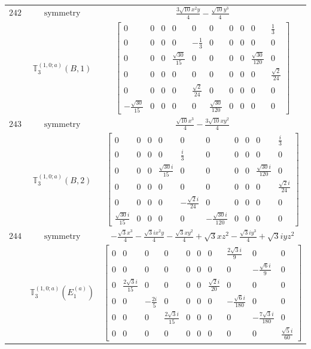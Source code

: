 \documentclass[fleqn,8pt,landscape]{jsarticle}
\begin{document}
\begin{longtable}{ccc}
$ 242 $ & $ \text{symmetry} $ & $ \frac{3 \sqrt{10} x^{2} y}{4} - \frac{\sqrt{10} y^{3}}{4} $ \\
$  $ & $ \mathbb{T}_{3}^{(1,0;a)}(B,1) $ & $ \begin{bmatrix} 0 & 0 & 0 & 0 & 0 & 0 & 0 & 0 & 0 & \frac{1}{3} \\ 0 & 0 & 0 & 0 & - \frac{1}{3} & 0 & 0 & 0 & 0 & 0 \\ 0 & 0 & 0 & \frac{\sqrt{30}}{15} & 0 & 0 & 0 & 0 & \frac{\sqrt{30}}{120} & 0 \\ 0 & 0 & 0 & 0 & 0 & 0 & 0 & 0 & 0 & \frac{\sqrt{2}}{24} \\ 0 & 0 & 0 & 0 & \frac{\sqrt{2}}{24} & 0 & 0 & 0 & 0 & 0 \\ - \frac{\sqrt{30}}{15} & 0 & 0 & 0 & 0 & \frac{\sqrt{30}}{120} & 0 & 0 & 0 & 0 \end{bmatrix} $ \\ \hline
$ 243 $ & $ \text{symmetry} $ & $ \frac{\sqrt{10} x^{3}}{4} - \frac{3 \sqrt{10} x y^{2}}{4} $ \\
$  $ & $ \mathbb{T}_{3}^{(1,0;a)}(B,2) $ & $ \begin{bmatrix} 0 & 0 & 0 & 0 & 0 & 0 & 0 & 0 & 0 & \frac{i}{3} \\ 0 & 0 & 0 & 0 & \frac{i}{3} & 0 & 0 & 0 & 0 & 0 \\ 0 & 0 & 0 & \frac{\sqrt{30} i}{15} & 0 & 0 & 0 & 0 & \frac{\sqrt{30} i}{120} & 0 \\ 0 & 0 & 0 & 0 & 0 & 0 & 0 & 0 & 0 & \frac{\sqrt{2} i}{24} \\ 0 & 0 & 0 & 0 & - \frac{\sqrt{2} i}{24} & 0 & 0 & 0 & 0 & 0 \\ \frac{\sqrt{30} i}{15} & 0 & 0 & 0 & 0 & - \frac{\sqrt{30} i}{120} & 0 & 0 & 0 & 0 \end{bmatrix} $ \\ \hline
$ 244 $ & $ \text{symmetry} $ & $ - \frac{\sqrt{3} x^{3}}{4} - \frac{\sqrt{3} i x^{2} y}{4} - \frac{\sqrt{3} x y^{2}}{4} + \sqrt{3} x z^{2} - \frac{\sqrt{3} i y^{3}}{4} + \sqrt{3} i y z^{2} $ \\
$  $ & $ \mathbb{T}_{3}^{(1,0;a)}(E_{1}^{(a)}) $ & $ \begin{bmatrix} 0 & 0 & 0 & 0 & 0 & 0 & 0 & \frac{2 \sqrt{3} i}{9} & 0 & 0 \\ 0 & 0 & 0 & 0 & 0 & 0 & 0 & 0 & - \frac{\sqrt{6} i}{9} & 0 \\ 0 & \frac{2 \sqrt{3} i}{15} & 0 & 0 & 0 & 0 & \frac{\sqrt{2} i}{20} & 0 & 0 & 0 \\ 0 & 0 & - \frac{2 i}{5} & 0 & 0 & 0 & 0 & - \frac{\sqrt{6} i}{180} & 0 & 0 \\ 0 & 0 & 0 & \frac{2 \sqrt{3} i}{15} & 0 & 0 & 0 & 0 & - \frac{7 \sqrt{3} i}{180} & 0 \\ 0 & 0 & 0 & 0 & 0 & 0 & 0 & 0 & 0 & \frac{\sqrt{5} i}{60} \end{bmatrix} $ \\ \hline

\end{longtable}
\end{document}
